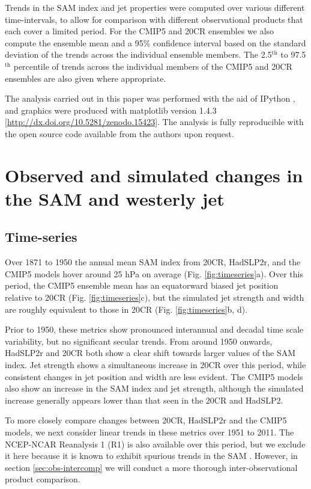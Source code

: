 \documentclass{ametsoc}
\begin{document}
Trends in the SAM index and jet properties were 
computed over various different time-intervals, to allow for comparison with different observational
products that each cover a limited period. For the CMIP5 and 20CR ensembles we also compute 
the ensemble mean and a 95\% confidence interval based on the standard deviation 
of the trends across the individual ensemble members. The 2.5$^\textrm{th}$ to 
97.5$^\textrm{th}$ percentile of trends across the individual 
members of the CMIP5 and 20CR ensembles are also given where appropriate.

The analysis carried out in this paper was performed with the aid of 
IPython \citep{Perez_and_Granger_2007}, and graphics were produced 
with matplotlib \citep{Hunter_2007} version 
1.4.3 [\url{http://dx.doi.org/10.5281/zenodo.15423}]. The analysis is
fully reproducible with the open source code 
available from the authors upon request.


\section{Observed and simulated changes in the SAM and westerly jet} \label{sec:obs_sim_changes}
\subsection{Time-series}
Over 1871 to 1950 the annual mean SAM index from 20CR, HadSLP2r, and the 
CMIP5 models hover around 25 hPa on average (Fig. \ref{fig:timeseries}a). 
Over this period, the CMIP5 ensemble mean has an equatorward biased jet position  
relative to 20CR (Fig. \ref{fig:timeseries}c), but the simulated 
jet strength and width are roughly
equivalent to those in 20CR (Fig. \ref{fig:timeseries}b, d). 

Prior to 1950, these metrics show pronounced
interannual and decadal time scale variability, but no significant secular  
trends. From around 1950 onwards, HadSLP2r and 20CR both show a clear shift towards 
larger values of the SAM index. Jet strength shows a simultaneous increase 
in 20CR over this period, while consistent changes in jet position and width are less evident. The 
CMIP5 models also show an increase in the SAM index and jet strength, although the simulated 
increase generally appears lower than that seen in the 20CR and HadSLP2. 

To more closely compare changes between 20CR, HadSLP2r and the CMIP5 models, we next consider linear 
trends in these metrics over 1951 to 2011. The NCEP-NCAR Reanalysis 1 (R1) is also available
over this period, but we exclude it here because it is known to exhibit spurious 
trends in the SAM \citep{Marshall_2003}. However, in section \ref{sec:obs-intercomp} 
we will conduct a more thorough inter-observational product comparison. 
\end{document}
